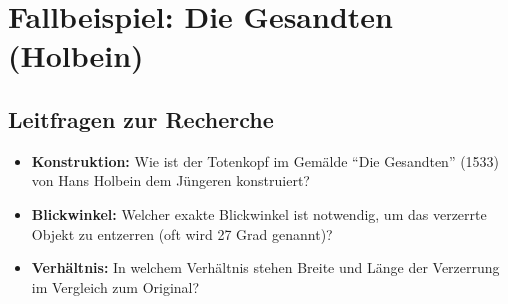 \section{Fallbeispiel: Die Gesandten (Holbein)}

\subsection*{Leitfragen zur Recherche}
\begin{itemize}
    \item \textbf{Konstruktion:} Wie ist der Totenkopf im Gemälde \enquote{Die Gesandten} (1533) von Hans Holbein dem Jüngeren konstruiert?
    \item \textbf{Blickwinkel:} Welcher exakte Blickwinkel ist notwendig, um das verzerrte Objekt zu entzerren (oft wird 27 Grad genannt)?
    \item \textbf{Verhältnis:} In welchem Verhältnis stehen Breite und Länge der Verzerrung im Vergleich zum Original?
\end{itemize}

